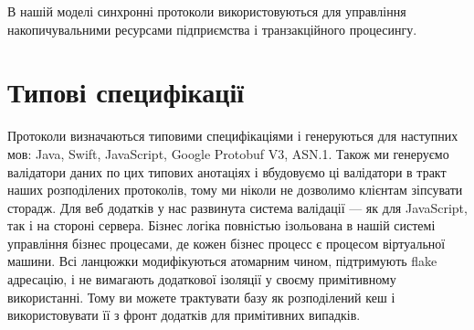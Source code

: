         В нашій моделі синхронні протоколи використовуються для управління
           накопичувальними ресурсами підприємства і транзакційного процесингу.

        \section{Типові специфікації}

        Протоколи визначаються типовими специфікаціями і генеруються для наступних мов:
           Java, Swift, JavaScript, Google Protobuf V3, ASN.1. Також ми генеруємо валідатори даних по цих
           типових анотаціях і вбудовуємо ці валідатори в тракт наших розподілених протоколів,
           тому ми ніколи не дозволимо клієнтам зіпсувати сторадж. Для веб додатків у нас развинута
           система валідації — як для JavaScript, так і на стороні сервера. Бізнес логіка повністью ізольована в нашій
           системі управління бізнес процесами, де кожен бізнес процесс
           є процесом віртуальної машини. Всі ланцюжки модифікуються атомарним чином,
           підтримують flake адресацію, і не вимагають додаткової ізоляції
           у своєму примітивному використанні.
           Тому ви можете трактувати базу як розподілений кеш
           і використовувати її з фронт додатків для примітивних випадків.
